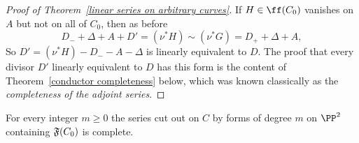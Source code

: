 \begin{proof}[Proof of Theorem~\ref{linear series on arbitrary curves}]
If $H\in \ff(C_{0})$ vanishes on $A$ but not on all of $C_{0}$, then
as before
$$
 D_{-} +\Delta + A+ D' = (\nu^*H) \sim (\nu^*G) = D_{+} + \Delta + A,
$$
So $D' = (\nu^*{H})-D_{-}-A-\Delta$ is linearly equivalent to $D$. The
proof that every
divisor $D'$ linearly equivalent to $D$ has this form is the content of
Theorem~\ref{conductor completeness} below,
which was known classically as the \emph{completeness of the adjoint series}.
%
\end{proof}

\begin{theorem}\label{conductor completeness}
For every integer $m\geq 0$ the series cut out on $C$ by forms of
degree $m$
on $\PP^{2}$ containing $\adj(C_{0})$ is complete.
\end{theorem}

